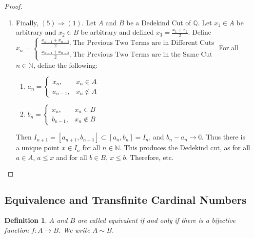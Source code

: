\documentclass[12pt,oneside]{book}
\theoremstyle{mystyle}
\newtheorem{definition}{Definition}[section]
\begin{document}
\begin{proof}
\begin{enumerate}
\item Finally, $(5)\Rightarrow (1)$. Let $A$ and $B$ be a Dedekind Cut of $\mathbb{Q}$. Let $x_1 \in A$ be arbitrary and $x_2 \in B$ be arbitrary and defined $x_3 = \frac{x_1+x_2}{2}$. Define\\ $x_n = \begin{cases} \frac{x_{n-1}+x_{n-2}}{2}, \textrm{The Previous Two Terms are in Different Cuts}\\\frac{x_{n-1}+x_{n-3}}{2}, \textrm{The Previous Two Terms are in the Same Cut}\end{cases}$
For all $n\in \mathbb{N}$, define the following:
\begin{paracol}{2}
\begin{enumerate}
\item $a_n = \begin{cases} x_n, & x_n \in A \\ a_{n-1}, & x_n \notin A\end{cases}$
\switchcolumn
\item $b_n = \begin{cases} x_n, & x_n \in B \\ b_{n-1}, & x_n \notin B\end{cases}$
\end{enumerate}
\end{paracol}
Then $I_{n+1} = [a_{n+1},b_{n+1}] \subset [a_n,b_n]=I_n$, and $b_n-a_n \rightarrow 0$. Thus there is a unique point $x\in I_n$ for all $n\in \mathbb{N}$. This produces the Dedekind cut, as for all $a\in A$, $a\leq x$ and for all $b\in B$, $x\leq b$. Therefore, etc.
\end{enumerate}
\end{proof}
%
\subsection{Equivalence and Transfinite Cardinal Numbers}
%
\begin{definition}
$A$ and $B$ are called equivalent if and only if there is a bijective function $f:A\rightarrow B$. We write $A\sim B$.
\end{definition}
\end{document}
